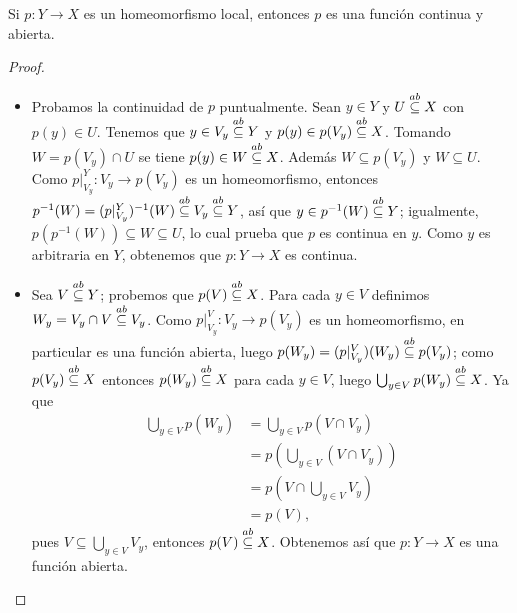 \begin{Prop}
   Si $p:Y\to X$ es un homeomorfismo local, entonces $p$ es una función continua y abierta.
\end{Prop}
\begin{proof}
   \begin{itemize}
      \item Probamos la continuidad de $p$ puntualmente. Sean $y\in Y$ y $U\stackrel{ab}{\subseteq} X$ con $p(y)\in U$. Tenemos que $y\in V_y\stackrel{ab}{\subseteq} Y$ y $p(y)\in p(V_y)\stackrel{ab}{\subseteq} X$. Tomando $W=p(V_y)\cap U$ se tiene $p(y)\in W\stackrel{ab}{\subseteq} X$. Además $W\subseteq p(V_y)$ y $W\subseteq U$. Como $p|^{Y}_{V_y}:V_y\to p(V_y)$ es un homeomorfismo, entonces $p^{-1}(W)=(p|^{Y}_{V_y})^{-1}(W)\stackrel{ab}{\subseteq} V_y \stackrel{ab}{\subseteq} Y$, así que $y\in p^{-1}(W)\stackrel{ab}{\subseteq} Y$; igualmente, $p(p^{-1}(W))\subseteq W \subseteq U$, lo cual prueba que $p$ es continua en $y$. Como $y$ es arbitraria en $Y$, obtenemos que $p:Y\to X$ es continua.
      \item Sea $V\stackrel{ab}{\subseteq} Y$; probemos que $p(V)\stackrel{ab}{\subseteq} X$. Para cada $y\in V$ definimos $W_y=V_y\cap V\stackrel{ab}{\subseteq} V_y$. Como $p|^{V}_{V_y}:V_y\to p(V_y)$ es un homeomorfismo, en particular es una función abierta, luego $p(W_y)=(p|^{V}_{V_y})(W_y)\stackrel{ab}{\subseteq} p(V_y)$; como $p(V_y)\stackrel{ab}{\subseteq} X$ entonces $p(W_y)\stackrel{ab}{\subseteq} X$ para cada $y\in V$, luego $\bigcup_{y\in V} p(W_y)\stackrel{ab}{\subseteq} X$. Ya que
         $$
         \begin{aligned}
            \bigcup_{y\in V}p(W_y)&=\bigcup_{y\in V}p(V\cap V_y)\\
                                  &=p\left( \bigcup_{y\in V}(V\cap V_y)\right)\\
                                  &=p\left( V\cap\bigcup_{y\in V}V_y\right)\\
                                  &=p(V),
         \end{aligned}
         $$
         pues $V\subseteq \bigcup_{y\in V}V_y$, entonces $p(V)\stackrel{ab}{\subseteq} X$. Obtenemos así que $p:Y\to X$ es una función abierta.
   \end{itemize}
\end{proof}
